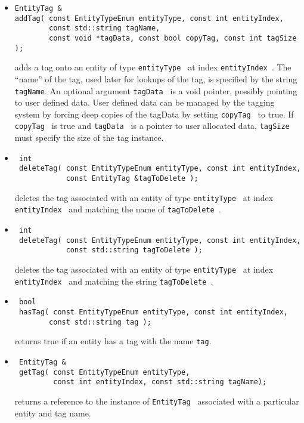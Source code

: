 \begin{itemize}

\item \begin{verbatim}  
EntityTag & 
addTag( const EntityTypeEnum entityType, const int entityIndex, 
        const std::string tagName,
        const void *tagData, const bool copyTag, const int tagSize ); \end{verbatim}
adds a tag onto an entity of type {\tt entityType } at index {\tt entityIndex }.  The ``name'' of the tag, used later
for lookups of the tag, is specified by the string {\tt tagName}.  An optional argument {\tt tagData } is a void
pointer, possibly pointing to user defined data.  User defined data can be managed by the tagging system by
forcing deep copies of the tagData by setting {\tt copyTag } to true.  If {\tt copyTag } is true and {\tt tagData }
is a pointer to user allocated data, {\tt tagSize } must specify the size of the tag instance.

\item \begin{verbatim}  
 int 
 deleteTag( const EntityTypeEnum entityType, const int entityIndex, 
            const EntityTag &tagToDelete ); \end{verbatim}
deletes the tag associated with an entity of type {\tt entityType } at index {\tt entityIndex } and matching the name
of {\tt tagToDelete }.

\item \begin{verbatim} 
 int 
 deleteTag( const EntityTypeEnum entityType, const int entityIndex, 
            const std::string tagToDelete ); \end{verbatim}
deletes the tag associated with an entity of type {\tt entityType } at index {\tt entityIndex } and matching the string
{\tt tagToDelete }.
  
\item \begin{verbatim}  
 bool 
 hasTag( const EntityTypeEnum entityType, const int entityIndex, 
        const std::string tag ); \end{verbatim}
returns true if an entity has a tag with the name {\tt tag}.

\item \begin{verbatim}  
 EntityTag & 
 getTag( const EntityTypeEnum entityType, 
         const int entityIndex, const std::string tagName); \end{verbatim}
returns a reference to the instance of {\tt EntityTag } associated with a particular entity and tag name.


\end{itemize}
